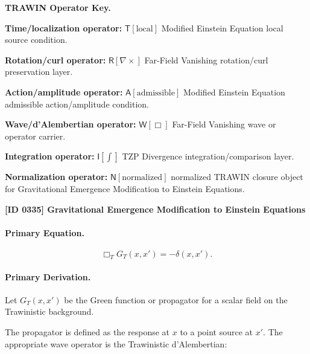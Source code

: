 \par\vspace{0.45\baselineskip}
\noindent\begin{minipage}[t]{\linewidth}
\begingroup
\small
\raggedright
\textbf{TRAWIN Operator Key.}\par
\noindent\textbf{Time/localization operator:} $\mathsf{T}\!\left[\mathrm{local}\right]$ Modified Einstein Equation local source condition.\par
\noindent\textbf{Rotation/curl operator:} $\mathsf{R}\!\left[\nabla\times\right]$ Far-Field Vanishing rotation/curl preservation layer.\par
\noindent\textbf{Action/amplitude operator:} $\mathsf{A}\!\left[\mathrm{admissible}\right]$ Modified Einstein Equation admissible action/amplitude condition.\par
\noindent\textbf{Wave/d'Alembertian operator:} $\mathsf{W}\!\left[\Box\right]$ Far-Field Vanishing wave or operator carrier.\par
\noindent\textbf{Integration operator:} $\mathsf{I}\!\left[\int\right]$ TZP Divergence integration/comparison layer.\par
\noindent\textbf{Normalization operator:} $\mathsf{N}\!\left[\mathrm{normalized}\right]$ normalized TRAWIN closure object for Gravitational Emergence Modification to Einstein Equations.\par
\endgroup
\end{minipage}

\clearpage
\noindent\textbf{[ID 0335] Gravitational Emergence Modification to Einstein Equations}\par
\vspace{0.35em}
\paragraph{Primary Equation.}
\begin{equation}
\Box_T G_T(x,x')
=
-\delta(x,x') .
\end{equation}

\paragraph{Primary Derivation.}
Let $G_T(x,x')$ be the Green function or propagator for a scalar field on the Trawinistic background.

The propagator is defined as the response at $x$ to a point source at $x'$.  
The appropriate wave operator is the Trawinistic d'Alembertian:

